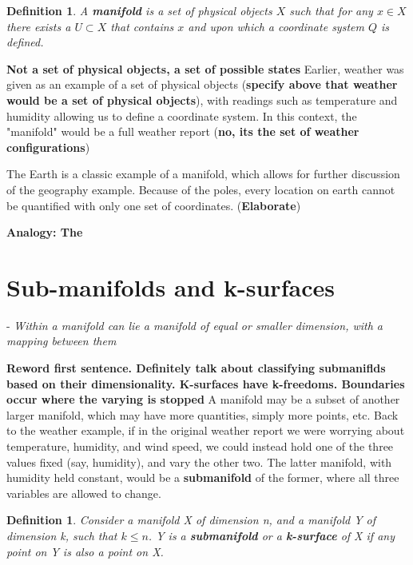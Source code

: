 \documentclass{book}
\newtheorem{defn}[equation]{Definition}
\begin{document}
\begin{defn}
	A \textbf{manifold} is a set of physical objects $X$ such that for any $x \in X$ there exists a $U \subset X$ that contains $x$ and upon which a coordinate system $Q$ is defined.
\end{defn}

\textbf{Not a set of physical objects, a set of possible states}
Earlier, weather was given as an example of a set of physical objects (\textbf{specify above that weather would be a set of physical objects}), with readings such as temperature and humidity allowing us to define a coordinate system. In this context, the "manifold" would be a full weather report (\textbf{no, its the set of weather configurations}) 

The Earth is a classic example of a manifold, which allows for further discussion of the geography example. Because of the poles, every location on earth cannot be quantified with only one set of coordinates. (\textbf{Elaborate})
 

\textbf{Analogy: The }

\section{Sub-manifolds and k-surfaces}

- \emph{Within a manifold can lie a manifold of equal or smaller dimension, with a mapping between them}

\textbf{Reword first sentence. Definitely talk about classifying submaniflds based on their dimensionality. K-surfaces have k-freedoms. Boundaries occur where the varying is stopped}
A manifold may be a subset of another larger manifold, which may have more quantities, simply more points, etc. Back to the weather example, if in the original weather report we were worrying about temperature, humidity, and wind speed, we could instead hold one of the three values fixed (say, humidity), and vary the other two. The latter manifold, with humidity held constant, would be a \textbf{submanifold} of the former, where all three variables are allowed to change.


\begin{defn}
	Consider a manifold X of dimension n, and a manifold Y of dimension k, such that $k \leq n$. Y is a \textbf{submanifold} or a \textbf{k-surface} of X if any point on Y is also a point on X. 
\end{defn}

\end{document}

